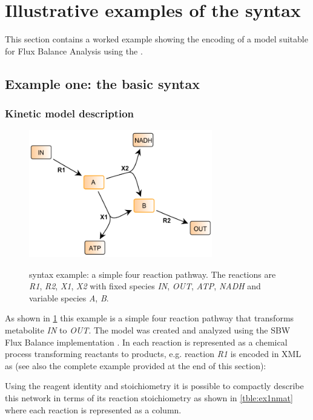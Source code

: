 
\section{Illustrative examples of the \FBC syntax}
\label{examples}

This section contains a worked example showing the encoding of a model suitable for Flux Balance Analysis using the \FBCPackage.

\subsection{Example one: the basic \FBC syntax}
\label{examples1}
\subsubsection{Kinetic model description}
\begin{figure}[h]
  \centering
  \includegraphics[width=8cm]{examples/spec-example1.pdf}\\
  \caption{\FBC syntax example: a simple four reaction pathway. The
  reactions are \textit{R1}, \textit{R2}, \textit{X1}, \textit{X2} with
  fixed species \textit{IN}, \textit{OUT}, \textit{ATP}, \textit{NADH} and
  variable species \textit{A}, \textit{B}.}
  \label{fig:example1}
\end{figure}

As shown in \ref{fig:example1} this example is a simple four reaction
pathway that transforms metabolite \textit{IN} to \textit{OUT}. The
model was created and analyzed using the \textsf{SBW Flux Balance} \FBC
implementation \citep{sbwfba, sbw}. In \SBML each reaction is represented
as a chemical process transforming reactants to products, e.g. reaction
\textit{R1} is encoded in XML as (see also the complete example provided
at the end of this section):


%
%
Using the reagent identity and stoichiometry it is possible to compactly
describe this network in terms of its reaction stoichiometry as shown in
\ref{tble:ex1nmat} where each reaction is represented as a column.

